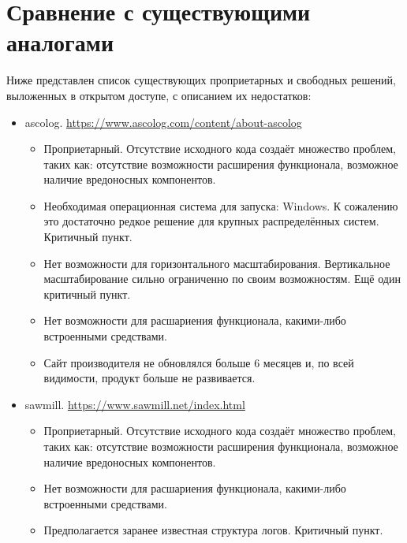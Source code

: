 \section{Сравнение с существующими аналогами}
Ниже представлен список существующих проприетарных и свободных решений,
выложенных в открытом доступе, с описанием их недостатков:
\begin{itemize}
  \item ascolog.
    \href{https://www.ascolog.com/content/about-ascolog}
    {https://www.ascolog.com/content/about-ascolog}

    \begin{itemize}
      \item Проприетарный. Отсутствие исходного кода создаёт множество проблем,
        таких как: отсутствие возможности расширения функционала,
        возможное наличие вредоносных компонентов.
      \item Необходимая операционная система для запуска: Windows. К сожалению
        это достаточно редкое решение для крупных распределённых систем.
        Критичный пункт.
      \item Нет возможности для горизонтального масштабирования.
        Вертикальное масштабирование сильно ограниченно по своим возможностям.
        Ещё один критичный пункт.
      \item Нет возможности для расшариения функционала, какими-либо
        встроенными средствами.
      \item Сайт производителя не обновлялся больше 6 месяцев и, по всей
        видимости, продукт больше не развивается.
    \end{itemize}

  \item sawmill.
    \href{https://www.sawmill.net/index.html}
    {https://www.sawmill.net/index.html}

    \begin{itemize}
      \item Проприетарный. Отсутствие исходного кода создаёт множество проблем,
        таких как: отсутствие возможности расширения функционала,
        возможное наличие вредоносных компонентов.
      \item Нет возможности для расшариения функционала, какими-либо
        встроенными средствами.
      \item Предполагается заранее известная структура логов. Критичный пункт.
    \end{itemize}
\end{itemize}

